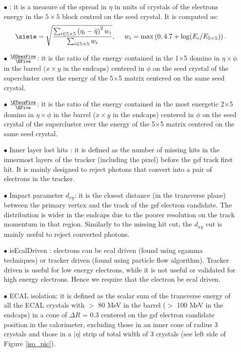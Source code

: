 \begin{itemize}
\item[$\bullet$] \textbf{\sieie}:
it is a measure of the spread in $\eta$ in units of crystals of the electrons energy in the $5\times5$ block centred on the seed crystal. It is computed as:
    $$\sieie = \sqrt{ \frac
      { \sum_{i \in 5\times5} \left( \eta_i - \bar \eta \right )^2 w_i
      } {\sum_{i \in 5\times5} w_i} }, ~~~~
    w_i = \max \left( 0, 4.7 + \log(E_i / E_{5\times5}) \right ).
    $$
\item[$\bullet$] \textbf{$\frac{\EOnexFive}{\EFive}$}: it is the ratio of the energy contained in the 1$\times$5 domino in $\eta\times\phi$ in the barrel ($x\times y$ in the endcaps) centered in $\phi$ on the seed crystal of the supercluster over the energy of the 5$\times$5 matrix centered on the same seed crystal.
\item[$\bullet$] \textbf{$\frac{\ETwoxFive}{\EFive}$}: it is the ratio of the energy contained in the most energetic 2$\times$5 domino in $\eta\times\phi$ in the barrel ($x\times y$ in the endcaps) centered in $\phi$ on the seed crystal of the supercluster over the energy of the 5$\times$5 matrix centered on the same seed crystal.
\item[$\bullet$] Inner layer lost hits : it is defined as the number of missing hits in the innermost layers of the tracker
(including the pixel) before the gsf track first hit. It is mainly designed to reject photons that convert into a pair of electrons in the tracker.
\item[$\bullet$] Impact parameter $d_{xy}$: it is the closest distance (in the transverse plane) between the primary vertex and the track of the gsf electron candidate. The distribution is wider in the endcaps due to the poorer resolution on the track momentum in that region. Similarly to the missing hit cut, the $d_{xy}$ cut is mainly useful to reject converted photons.
\item[$\bullet$] isEcalDriven : electrons can be ecal driven (found using egamma techniques) or tracker driven (found using particle flow algorithm). Tracker driven is useful for low energy electrons, while it is not useful or validated for high energy electrons. Hence we require that the electron be ecal driven.
\item[$\bullet$] ECAL isolation: it is defined as the scalar sum of the transverse energy of all the ECAL crystals with \et$>$
80 MeV in the barrel (\et$>$ 100 MeV in the endcaps) in a cone of $\Delta R$ = 0.3
centered on the gsf electron candidate position in the calorimeter, excluding those
in an inner cone of radius 3 crystals and those in a $|\eta|$ strip of total width of 3 crystals (see left side of Figure \ref{iso_pic}).

\end{itemize}
